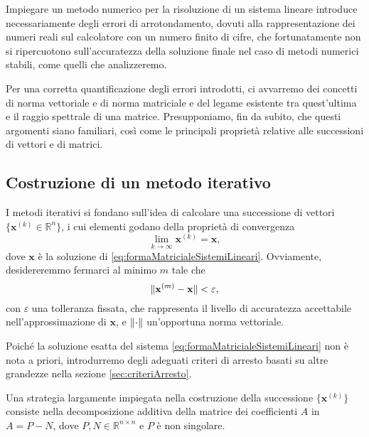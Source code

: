 Impiegare un metodo numerico per la risoluzione di un sistema lineare introduce necessariamente degli errori di arrotondamento, dovuti alla rappresentazione
dei numeri reali sul calcolatore con un numero finito di cifre, che fortunatamente non si ripercuotono sull'accuratezza della soluzione finale nel caso di
metodi numerici stabili, come quelli che analizzeremo.

Per una corretta quantificazione degli errori introdotti, ci avvarremo dei concetti di norma vettoriale e di norma
matriciale e del legame esistente tra quest'ultima e il raggio spettrale di una matrice.\newline
Presupponiamo, fin da subito, che questi argomenti siano familiari, cos\`i come le principali propriet\`a relative alle successioni di vettori e di matrici.
\subsection{Costruzione di un metodo iterativo}
I metodi iterativi si fondano sull'idea di calcolare una successione di vettori \\ $\{\mathbf{x}^{(k)}\in\mathbb{R}^{n}\}$, i cui elementi godano della propriet\`a di convergenza
\begin{equation}
    \label{eq:proprietaConvergenza}
    \lim_{k \to \infty} \mathbf{x}^{(k)}=\mathbf{x},
\end{equation}
dove $\mathbf{x}$ \`e la soluzione di \eqref{eq:formaMatricialeSistemiLineari}. \newline
Ovviamente, desidereremmo fermarci al minimo $m$ tale che
\begin{equation*}
    \lVert\mathbf{x}^{(m)}- \mathbf{x}\rVert < \varepsilon,
\end{equation*}
con $\varepsilon$ una tolleranza fissata, che rappresenta il livello di accuratezza accettabile nell'approssimazione di $\mathbf{x}$, e $\lVert\cdot\rVert$ un'opportuna norma vettoriale.

Poich\'e la soluzione esatta del sistema \eqref{eq:formaMatricialeSistemiLineari} non \`e nota a priori, introdurremo degli adeguati criteri di arresto basati
su altre grandezze nella sezione \ref{sec:criteriArresto}.

Una strategia largamente impiegata nella costruzione della successione $\{\mathbf{x}^{(k)}\}$ consiste nella decomposizione additiva della matrice dei
coefficienti $A$ in $A=P-N$, dove $P, N\in\mathbb{R}^{n \times n}$ e $P$ \`e non singolare.

